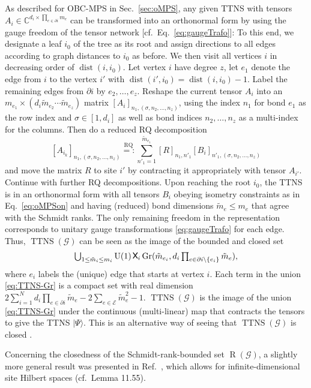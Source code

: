 \documentclass[english,11pt,aps,pra,onecolumn,tightenlines,groupedaddress,superscriptaddress,notitlepage,floatfix,fleqn]{revtex4-1}
\newcommand{\ket}{\rangle}
\newcommand{\dist}{\operatorname{dist}}
\newcommand{\s}{\sigma}
\newcommand{\CC}{\mathbb{C}}
\newcommand{\mc}[1]{\mathcal{#1}}
\newcommand{\E}{\mc{E}}
\newcommand{\G}{\mc{G}}
\newcommand{\TTNS}{\operatorname{TTNS}}
\newcommand{\R}{\operatorname{R}}
\newcommand{\Gr}{\operatorname{Gr}}
\newcommand{\U}{\operatorname{U}}
\newcommand{\RQ}{\text{RQ}}
\newcommand{\bigtimes}{\mathop{\tikz [x=1.2ex,y=1.6ex,line width=.2ex] \draw (0,0) -- (1,1) (0,1) -- (1,0);}}
\begin{document}
As described for OBC-MPS in Sec.~\ref{sec:oMPS}, any given TTNS with tensors $A_i\in\CC^{d_i\times \prod_{e\in\partial i}m_e}$ can be transformed into an orthonormal form by using the gauge freedom of the tensor network [cf.~Eq.~\eqref{eq:gaugeTrafo}]: To this end, we designate a leaf $i_0$ of the tree as its root and assign directions to all edges according to graph distances to $i_0$ as before. We then visit all vertices $i$ in decreasing order of $\dist(i,i_0)$. Let vertex $i$ have degree $z$, let $e_1$ denote the edge from $i$ to the vertex $i'$ with $\dist(i',i_0)=\dist(i,i_0)-1$. Label the remaining edges from $\partial i$ by $e_2,\dotsc,e_{z}$. Reshape the current tensor $A_i$ into an $m_{e_1}\times(d_i \tilde{m}_{e_2}\dotsb \tilde{m}_{e_z})$ matrix $[A_i]_{n_1,(\s,n_2,\dotsc,n_z)}$, using the index $n_1$ for bond $e_1$ as the row index and $\s\in[1,d_i]$ as well as bond indices $n_2,\dotsc,n_z$ as a multi-index for the columns. Then do a reduced RQ decomposition
\begin{equation}\textstyle
	[A_{i_k}]_{n_1,(\s,n_2,\dotsc,n_z)} \stackrel{\RQ}{=:} \sum_{n'_1=1}^{\tilde{m}_{e_1}} [R]_{n_1,n'_1} [B_i]_{n'_1,(\s,n_2,\dotsc,n_z)}
\end{equation}
and move the matrix $R$ to site $i'$ by contracting it appropriately with tensor $A_{i'}$. Continue with further RQ decompositions. Upon reaching the root $i_0$, the TTNS is in an orthonormal form with all tensors $B_i$ obeying isometry constraints as in Eq.~\eqref{eq:oMPSon} and having (reduced) bond dimensions $\tilde{m}_e\leq m_e$ that agree with the Schmidt ranks. The only remaining freedom in the representation corresponds to unitary gauge transformations \eqref{eq:gaugeTrafo} for each edge. Thus, $\TTNS(\G)$ can be seen as the image of the bounded and closed set
\begin{equation}\label{eq:TTNS-Gr}\textstyle
	\bigcup_{1\leq\tilde{m}_i\leq m_i} \U(1)\bigtimes_i\Gr(\tilde{m}_{e_i},d_i \prod_{e\in\partial i\setminus\{e_i\}} \tilde{m}_e),
\end{equation}
where $e_i$ labels the (unique) edge that starts at vertex $i$. Each term in the union \eqref{eq:TTNS-Gr} is a compact set with real dimension $2\sum_{i=1}^N d_i\prod_{e\in\partial i}\tilde{m}_e-2\sum_{e\in\E}\tilde{m}_e^2 -1$. $\TTNS(\G)$ is the image of the union \eqref{eq:TTNS-Gr} under the continuous (multi-linear) map that contracts the tensors to give the TTNS $|\Psi\ket$. This is an alternative way of seeing that $\TTNS(\G)$ is closed \cite{Rudin1976}.

Concerning the closedness of the Schmidt-rank-bounded set $\R(\G)$, a slightly more general result was presented in Ref.~\cite{Hackbusch2012}, which allows for infinite-dimensional site Hilbert spaces (cf.~Lemma 11.55).
\end{document}
